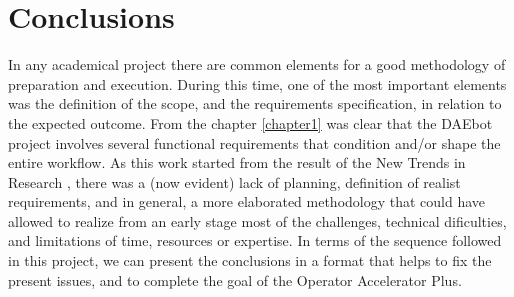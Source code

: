 %  
%  
%  
%  
%  
%  

\chapter{Conclusions} \label{conclusions}

In any academical project there are common elements for a good methodology of preparation and
execution. During this time, one of the most important elements was the definition of the scope, and
the requirements specification, in relation to the expected outcome. From the chapter \ref{chapter1}
was clear that the DAEbot project involves several functional requirements that condition and/or
shape the entire workflow. As this work started from the result of the New Trends in Research
\cite{ntr}, there was a (now evident) lack of planning, definition of realist requirements, and in
general, a more elaborated methodology that could have allowed to realize from an early stage most
of the challenges, technical dificulties, and limitations of time, resources or expertise. In terms
of the sequence followed in this project, we can present the conclusions in a format that helps to
fix the present issues, and to complete the goal of the Operator Accelerator Plus.

